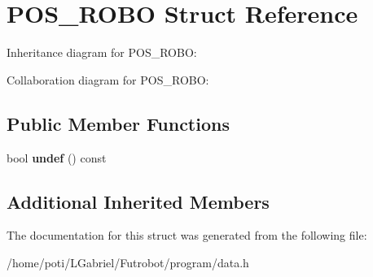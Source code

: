 \hypertarget{structPOS__ROBO}{}\section{P\+O\+S\+\_\+\+R\+O\+BO Struct Reference}
\label{structPOS__ROBO}


Inheritance diagram for P\+O\+S\+\_\+\+R\+O\+BO\+:


Collaboration diagram for P\+O\+S\+\_\+\+R\+O\+BO\+:
\subsection*{Public Member Functions}
\begin{DoxyCompactItemize}
\item 
bool {\bfseries undef} () const \hypertarget{structPOS__ROBO_a137821b593b8453ef4579959a753a729}{}\label{structPOS__ROBO_a137821b593b8453ef4579959a753a729}

\end{DoxyCompactItemize}
\subsection*{Additional Inherited Members}


The documentation for this struct was generated from the following file\+:\begin{DoxyCompactItemize}
\item 
/home/poti/\+L\+Gabriel/\+Futrobot/program/data.\+h\end{DoxyCompactItemize}
